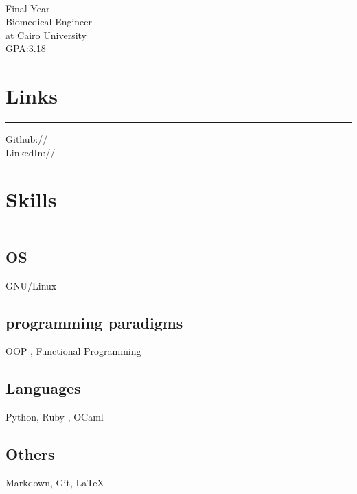 \documentclass[]{rahulworld-resume}
\begin{document}
%
%

\begin{minipage}[t]{0.33\textwidth} 
\begin{large}
	\\
\end{large}
Final Year \\
Biomedical Engineer  \\ 
at Cairo University \\ 
GPA:3.18  

\section{Links} 
\noindent\rule{5cm}{0.4pt}

Github:// \href{https://github.com/adel-elmala}{} \\
LinkedIn://  \href{https://www.linkedin.com/in/adel-elmala-70b774133/}{} \\

\section{Skills}
\noindent\rule{5cm}{0.4pt}
\subsection{OS}
GNU/Linux
\vspace{6pt}
\subsection{programming paradigms}
OOP , Functional Programming
\vspace{6pt}
\subsection{Languages}
Python, Ruby , OCaml
\vspace{6pt}
\subsection{Others}
Markdown, Git, \LaTeX
 
\sectionsep

\end{minipage}
\end{document}
